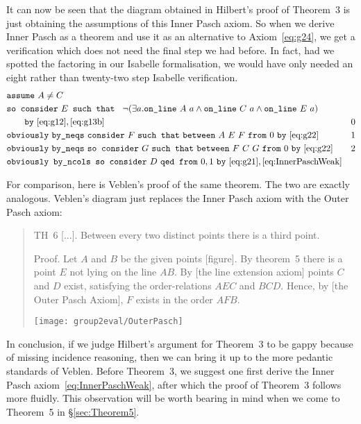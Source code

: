It can now be seen that the diagram obtained in Hilbert's proof of Theorem~3 is just obtaining the assumptions of this Inner Pasch axiom. So when we derive Inner Pasch as a theorem and use it as an alternative to Axiom~\ref{eq:g24}, we get a verification which does not need the final step we had before. In fact, had we spotted the factoring in our Isabelle formalisation, we would have only needed an eight rather than twenty-two step Isabelle verification.
\begin{align*}
&\code{assume}\ A\neq C\\
&\code{so consider}\ E \code{ such that }\ \Triangle{a}{A}{C}{E}\\
&\qquad\code{by}\ \eqref{eq:g12},\eqref{eq:g13b}& 0\\
&\code{obviously}\ \code{by\_neqs}\ \code{consider}\ F\ \code{such that}\ \between{A}{E}{F}\ \code{from}\ 0\ \code{by}\ \eqref{eq:g22} & 1\\
&\code{obviously}\ \code{by\_neqs}\ \code{so consider}\ G\ \code{such that}\ \between{F}{C}{G}\ \code{from}\ 0\ \code{by}\ \eqref{eq:g22} & 2\\
&\code{obviously by\_ncols so consider}\ D\ \code{qed from}\ 0,1\ \code{by}\ \eqref{eq:g21},\eqref{eq:InnerPaschWeak}
\end{align*}

For comparison, here is Veblen's proof of the same theorem. The two are exactly analogous. Veblen's diagram just replaces the Inner Pasch axiom with the Outer Pasch axiom:
\begin{quotation}\label{sec:VeblenThree}
TH~6 [...]. Between every two distinct points there is a third point.

Proof. Let $A$ and $B$ be the given points [figure]. By theorem~5 there is a point $E$ not lying on the line $AB$. By [the line extension axiom] points $C$ and $D$ exist, satisfying the order-relations $AEC$ and $BCD$. Hence, by [the Outer Pasch Axiom], $F$ exists in the order $AFB$.

\centering\texttt{[image: group2eval/OuterPasch]}
\end{quotation}
In conclusion, if we judge Hilbert's argument for Theorem~3 to be gappy because of missing incidence reasoning, then we can bring it up to the more pedantic standards of Veblen. Before Theorem~3, we suggest one first derive the Inner Pasch axiom~\eqref{eq:InnerPaschWeak}, after which the proof of Theorem~3 follows more fluidly. This observation will be worth bearing in mind when we come to Theorem~5 in \S\ref{sec:Theorem5}.

